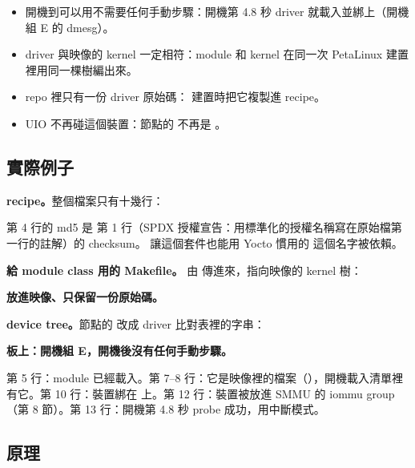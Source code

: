 \begin{gain}
\begin{itemize}
\item 開機到可以用不需要任何手動步驟：開機第 4.8 秒 driver 就載入並綁上（開機組 E 的 dmesg）。
\item driver 與映像的 kernel 一定相符：module 和 kernel 在同一次 PetaLinux 建置裡用同一棵樹編出來。
\item repo 裡只有一份 driver 原始碼： 建置時把它複製進 recipe。
\item UIO 不再碰這個裝置：節點的  不再是 。
\end{itemize}
\end{gain}

\subsection{實際例子}

\textbf{recipe。}整個檔案只有十幾行：


第 4 行的 md5 是  第 1 行（SPDX 授權宣告：用標準化的授權名稱寫在原始檔第一行的註解）的 checksum。 讓這個套件也能用 Yocto 慣用的  這個名字被依賴。

\textbf{給 module class 用的 Makefile。} 由  傳進來，指向映像的 kernel 樹：


\textbf{放進映像、只保留一份原始碼。}


\textbf{device tree。}節點的  改成 driver 比對表裡的字串：


\textbf{板上：開機組 E，開機後沒有任何手動步驟。}


第 5 行：module 已經載入。第 7--8 行：它是映像裡的檔案（），開機載入清單裡有它。第 10 行：裝置綁在  上。第 12 行：裝置被放進 SMMU 的 iommu group（第 8 節）。第 13 行：開機第 4.8 秒 probe 成功，用中斷模式。

\subsection{原理}

